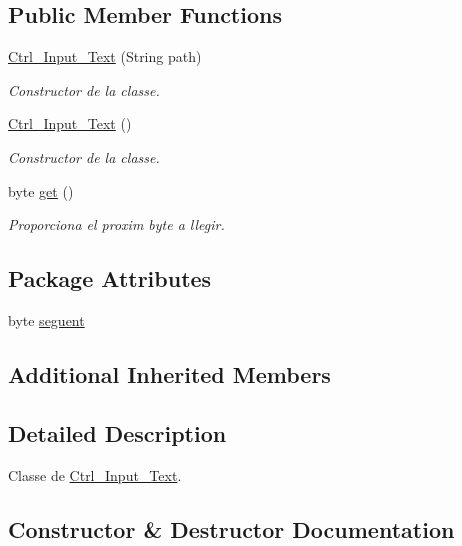 \subsection*{Public Member Functions}
\begin{DoxyCompactItemize}
\item 
\hyperlink{classpersistencia_1_1input_1_1Ctrl__Input__Text_a945833e6bb2bb3fbdb328ae01392410f}{Ctrl\+\_\+\+Input\+\_\+\+Text} (String path)
\begin{DoxyCompactList}\small\item\em Constructor de la classe. \end{DoxyCompactList}\item 
\hyperlink{classpersistencia_1_1input_1_1Ctrl__Input__Text_a91bc7bb52bcc996d89134892d5b48523}{Ctrl\+\_\+\+Input\+\_\+\+Text} ()
\begin{DoxyCompactList}\small\item\em Constructor de la classe. \end{DoxyCompactList}\item 
byte \hyperlink{classpersistencia_1_1input_1_1Ctrl__Input__Text_a8b501ae723f8c6f8d63305a56e9720c3}{get} ()
\begin{DoxyCompactList}\small\item\em Proporciona el proxim byte a llegir. \end{DoxyCompactList}\end{DoxyCompactItemize}
\subsection*{Package Attributes}
\begin{DoxyCompactItemize}
\item 
byte \hyperlink{classpersistencia_1_1input_1_1Ctrl__Input__Text_a533e9e0497774114b57d8dd5a6bbb000}{seguent}
\end{DoxyCompactItemize}
\subsection*{Additional Inherited Members}


\subsection{Detailed Description}
Classe de \hyperlink{classpersistencia_1_1input_1_1Ctrl__Input__Text}{Ctrl\+\_\+\+Input\+\_\+\+Text}. 

\subsection{Constructor \& Destructor Documentation}
\mbox{\label{classpersistencia_1_1input_1_1Ctrl__Input__Text_a945833e6bb2bb3fbdb328ae01392410f}} 

